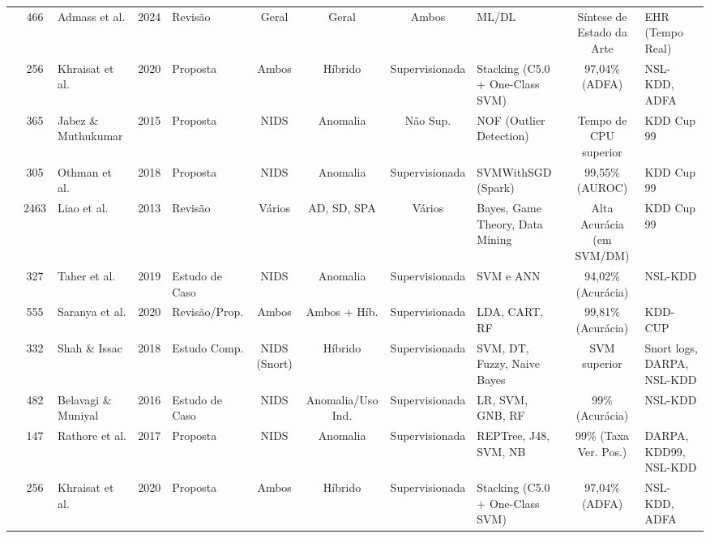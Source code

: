 \documentclass[a4paper,10pt, twocolumn]{article}
\begin{document}
\begin{table}[htbp]
\begin{adjustbox}{width=\textwidth}
\begin{tabular}{p{4cm} c p{3cm} c p{3cm} c c c p{4cm} c p{4cm}}
\cite{wasyhun2023cyber} & 466 & Admass et al. & 2024 & Revisão & Geral & Geral & Ambos & ML/DL & Síntese de Estado da Arte & EHR (Tempo Real) \\

\cite{Khraisat2019Hybrid} & 256 & Khraisat et al. & 2020 & Proposta & Ambos & Híbrido & Supervisionada & Stacking (C5.0 + One-Class SVM) & 97,04\% (ADFA) & NSL-KDD, ADFA \\

\cite{Jabez2015Intrusion} & 365 & Jabez \& Muthukumar & 2015 & Proposta & NIDS & Anomalia & Não Sup. & NOF (Outlier Detection) & Tempo de CPU superior & KDD Cup 99 \\

\cite{Othman2018Intrusion} & 305 & Othman et al. & 2018 & Proposta & NIDS & Anomalia & Supervisionada & SVMWithSGD (Spark) & 99,55\% (AUROC) & KDD Cup 99 \\

\cite{Liao2013Intrusion} & 2463 & Liao et al. & 2013 & Revisão & Vários & AD, SD, SPA & Vários & Bayes, Game Theory, Data Mining & Alta Acurácia (em SVM/DM) & KDD Cup 99 \\

\cite{Kazi2019network} & 327 & Taher et al. & 2019 & Estudo de Caso & NIDS & Anomalia & Supervisionada & SVM e ANN & 94,02\% (Acurácia) & NSL-KDD \\

\cite{Saranya2020Performance} & 555 & Saranya et al. & 2020 & Revisão/Prop. & Ambos & Ambos + Híb. & Supervisionada & LDA, CART, RF & 99,81\% (Acurácia) & KDD-CUP \\

\cite{Shah2018Performance} & 332 & Shah \& Issac & 2018 & Estudo Comp. & NIDS (Snort) & Híbrido & Supervisionada & SVM, DT, Fuzzy, Naive Bayes & SVM superior & Snort logs, DARPA, NSL-KDD \\

\cite{Belavagi2016Performance} & 482 & Belavagi \& Muniyal & 2016 & Estudo de Caso & NIDS & Anomalia/Uso Ind. & Supervisionada & LR, SVM, GNB, RF & 99\% (Acurácia) & NSL-KDD \\

\cite{Rathore2016RealTime} & 147 & Rathore et al. & 2017 & Proposta & NIDS & Anomalia & Supervisionada & REPTree, J48, SVM, NB & 99\% (Taxa Ver. Pos.) & DARPA, KDD99, NSL-KDD \\

\cite{Khraisat2019Survey} & 256 & Khraisat et al. & 2020 & Proposta & Ambos & Híbrido & Supervisionada & Stacking (C5.0 + One-Class SVM) & 97,04\% (ADFA) & NSL-KDD, ADFA \\


\end{tabular}
\end{adjustbox}
\end{table}
\end{document}
